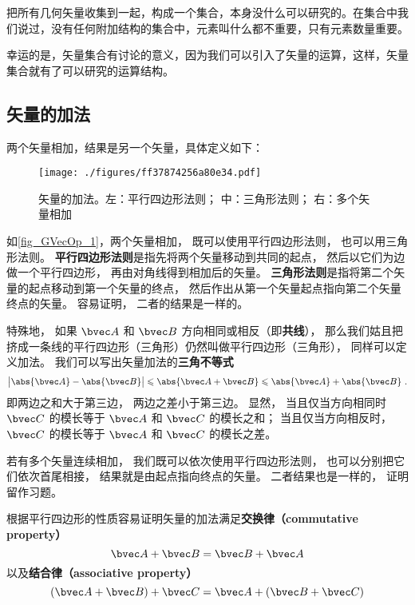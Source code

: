 

把所有几何矢量收集到一起，构成一个集合，本身没什么可以研究的。在集合中我们说过，没有任何附加结构的集合中，元素叫什么都不重要，只有元素数量重要。

幸运的是，矢量集合有讨论的意义，因为我们可以引入了矢量的运算，这样，矢量集合就有了可以研究的运算结构。

\subsection{矢量的加法}
两个矢量相加，结果是另一个矢量，具体定义如下：
\begin{figure}[ht]
\centering
\texttt{[image: ./figures/ff37874256a80e34.pdf]}
\caption{矢量的加法。左：平行四边形法则； 中：三角形法则； 右：多个矢量相加} \label{fig_GVecOp_1}
\end{figure}
如\autoref{fig_GVecOp_1}，两个矢量相加， 既可以使用平行四边形法则， 也可以用三角形法则。 \textbf{平行四边形法则}是指先将两个矢量移动到共同的起点， 然后以它们为边做一个平行四边形， 再由对角线得到相加后的矢量。 \textbf{三角形法则}是指将第二个矢量的起点移动到第一个矢量的终点， 然后作出从第一个矢量起点指向第二个矢量终点的矢量。 容易证明， 二者的结果是一样的。

特殊地， 如果 $\bvec A$ 和 $\bvec B$ 方向相同或相反（即\textbf{共线}）， 那么我们姑且把挤成一条线的平行四边形（三角形）仍然叫做平行四边形（三角形）， 同样可以定义加法。 我们可以写出矢量加法的\textbf{三角不等式}
\begin{equation}
\big|\abs{\bvec A} - \abs{\bvec B}\big| \leqslant \abs{\bvec A + \bvec B} \leqslant \abs{\bvec A} + \abs{\bvec B}~.
\end{equation}
即两边之和大于第三边， 两边之差小于第三边。 显然， 当且仅当方向相同时 $\bvec C$ 的模长等于 $\bvec A$ 和 $\bvec C$ 的模长之和； 当且仅当方向相反时， $\bvec C$ 的模长等于 $\bvec A$ 和 $\bvec C$ 的模长之差。 

若有多个矢量连续相加， 我们既可以依次使用平行四边形法则， 也可以分别把它们依次首尾相接， 结果就是由起点指向终点的矢量。 二者结果也是一样的， 证明留作习题。

根据平行四边形的性质容易证明矢量的加法满足\textbf{交换律（commutative property）}
\begin{equation}
\bvec A + \bvec B = \bvec B + \bvec A
\end{equation}
以及\textbf{结合律（associative property）}
\begin{equation}
(\bvec A + \bvec B) + \bvec C = \bvec A + (\bvec B + \bvec C)
\end{equation}

